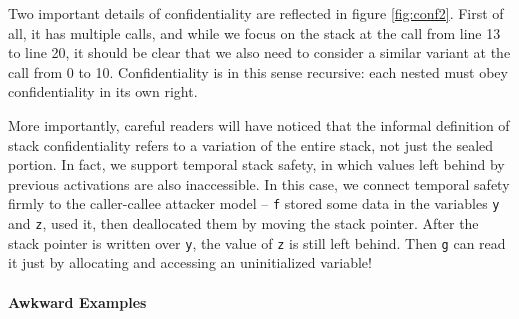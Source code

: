 Two important details of confidentiality are reflected in figure \ref{fig:conf2}.
First of all, it has multiple calls, and while we focus on the stack at the call
from line 13 to line 20, it should be clear that we also need to consider a similar
variant at the call from 0 to 10. Confidentiality is in this sense recursive: each
nested must obey confidentiality in its own right.

More importantly, careful readers will have noticed that the informal definition
of stack confidentiality refers to a variation of the entire stack, not just the
sealed portion. In fact, we support temporal stack safety, in which values left behind
by previous activations are also inaccessible. In this case, we connect temporal safety
firmly to the caller-callee attacker model -- {\tt f} stored some data in the variables
{\tt y} and {\tt z}, used it, then deallocated them by moving the stack pointer.
After the stack pointer is written over {\tt y}, the value of {\tt z} is still
left behind. Then {\tt g} can read it just by allocating and accessing an uninitialized
variable!

\paragraph*{Awkward Examples}
